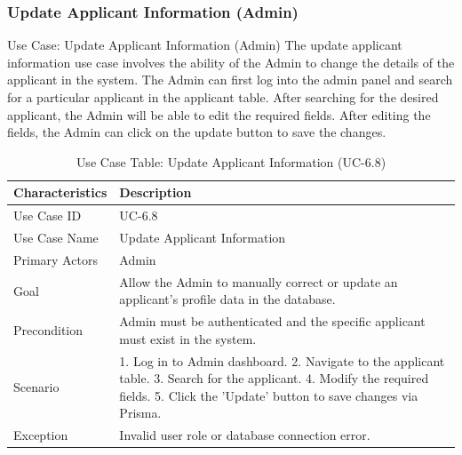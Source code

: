 \subsubsection{Update Applicant Information (Admin)}
Use Case: Update Applicant Information (Admin)
The update applicant information use case involves the ability of the Admin to change the details of the applicant in the system. The Admin can first log into the admin panel and search for a particular applicant in the applicant table. After searching for the desired applicant, the Admin will be able to edit the required fields. After editing the fields, the Admin can click on the update button to save the changes.
\begin{table}[H]
    \centering
    \small
    \renewcommand{\arraystretch}{1.4}
    \caption{Use Case Table: Update Applicant Information (UC-6.8)}
    \label{tab:update_applicant_info_admin}
    
    \begin{tabularx}{\textwidth}{|l|X|}
        \hline 
        \rowcolor[gray]{0.9} {Characteristics} & {Description} \\ \hline
        Use Case ID & UC-6.8 \\ \hline
        Use Case Name & Update Applicant Information \\ \hline
        Primary Actors & Admin \\ \hline
        Goal & Allow the Admin to manually correct or update an applicant's profile data in the database. \\ \hline
        Precondition & Admin must be authenticated and the specific applicant must exist in the system. \\ \hline
        Scenario & 1. Log in to Admin dashboard. 2. Navigate to the applicant table. 3. Search for the applicant. 4. Modify the required fields. 5. Click the 'Update' button to save changes via Prisma. \\ \hline
        Exception & Invalid user role or database connection error. \\ \hline
    \end{tabularx}
\end{table}
\FloatBarrier
